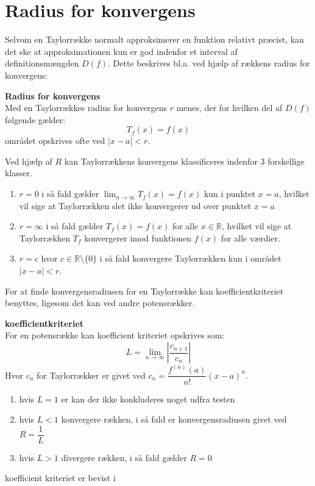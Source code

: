 \section{Radius for konvergens}
Selvom en Taylorrække normalt approksimerer en funktion relativt præcist, kan det ske at
approksimationen kun er god indenfor et interval af definitionsmængden $D(f)$. Dette beskrives bl.a. ved hjælp af rækkens
radius for konvergens:
\begin{defn} %
    \textbf{Radius for konvergens}\\
    Med en Taylorrækkes radius for konvergens $r$ menes, der for hvilken del af $D(f)$ følgende gælder:
    \[
        T_f(x) = f(x)
    \]
    området opskrives ofte ved $|x-a| < r$.
\end{defn}
\label{def:radiusForKonvergens}
Ved hjælp af $R$ kan Taylorrækkens konvergens klassificeres indenfor 3 forskellige klasser.
\begin{enumerate} %
    \item $r = 0$ i så fald gælder $\lim_{n \rightarrow \infty} T_f(x) = f(x)$ kun i punktet $x = a$,
    hvilket vil sige at Taylorrækken slet ikke konvergerer ud over punktet $x = a$
    \item $r = \infty$ i så fald gælder $T_f(x) = f(x)$ for alle $x \in \mathbb{R}$,
    hvilket vil sige at Taylorrækken $T_f$ konvergerer imod funktionen $f(x)$ for alle værdier.
    \item $r = c$ hvor $c \in \mathbb{R}\setminus\{0\}$ i så fald konvergere Taylorrækken kun i området $|x-a| < r$.
\end{enumerate}
For at finde konvergensradiusen for en Taylorrække kan koefficientkriteriet benyttes, ligesom det kan ved andre potensrækker.
\begin{defn} %
    \textbf{koefficientkriteriet}\\For en potensrække kan koefficient kriteriet opskrives som:
    \[
        L = \lim_{n \rightarrow \infty} \left\lvert \frac{c_{n + 1}}{c_n} \right\lvert
    \]
    Hvor $c_n$ for Taylorrækker er givet ved $c_n = \dfrac{f^{(n)}(a)}{n!}(x-a)^n$.
    \begin{enumerate}
        \item hvis $L = 1$ er kan der ikke konkluderes noget udfra testen
        \item hvis $L < 1$ konvergere rækken, i så fald er konvergensradiusen givet ved $R = \dfrac{1}{L}$
        \item hvis $L > 1$ divergere rækken, i så fald gælder $R = 0$
    \end{enumerate}
\end{defn} %
\label{def:koefficientKriteriet}
koefficient kriteriet er bevist i \citep{ratiotest}
